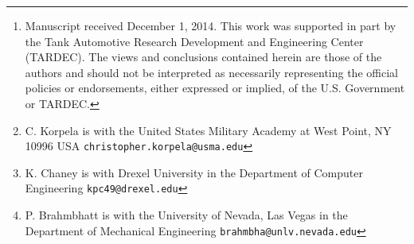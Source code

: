 \author{Christopher Korpela, Kenneth Chaney, and Pareshkumar Brahmbhatt
\thanks{Manuscript received December 1, 2014. This work was supported in part by the Tank Automotive Research Development and Engineering Center (TARDEC). The views and conclusions contained herein are those of the authors and should not be interpreted as necessarily representing the official policies or endorsements, either expressed or implied, of the U.S. Government or TARDEC.}
\thanks{C. Korpela is with the United States Military Academy at West Point, NY 10996 USA \tt\small{christopher.korpela{@}usma.edu}}
\thanks{K. Chaney is with Drexel University in the Department of Computer Engineering \tt\small{kpc49{@}drexel.edu}}
\thanks{P. Brahmbhatt is with the University of Nevada, Las Vegas in the Department of Mechanical Engineering \tt\small{brahmbha{@}unlv.nevada.edu}}}
